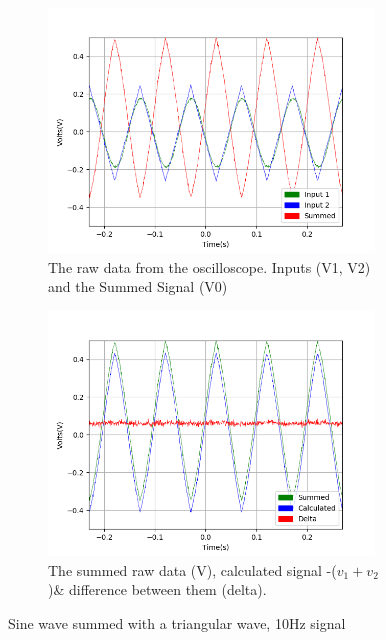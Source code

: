 \begin{figure}[h!]
\centering
\begin{subfigure}[t]{.475\textwidth}
  \centering
  \includegraphics[width=0.95\textwidth, height=0.25\textheight]{figures/Summing/scope_7raw.png}
  \caption{The raw data from the oscilloscope. Inputs (V1, V2) and the Summed Signal (V0)}
 \label{fig:sum_7_og_data}
\end{subfigure}\hfill
\begin{subfigure}[t]{.475\textwidth}
  \centering
  \includegraphics[width=0.95\textwidth, height=0.25\textheight]{figures/Summing/scope_7.png}
  \caption{The summed raw data (V), calculated signal -($v_1 + v_2$)\& difference between them (delta).}
\label{fig:sum_7_calc_data}
\end{subfigure}
\caption{Sine wave summed with a triangular wave, 10Hz signal}
\label{fig:sum_7}
\end{figure}

